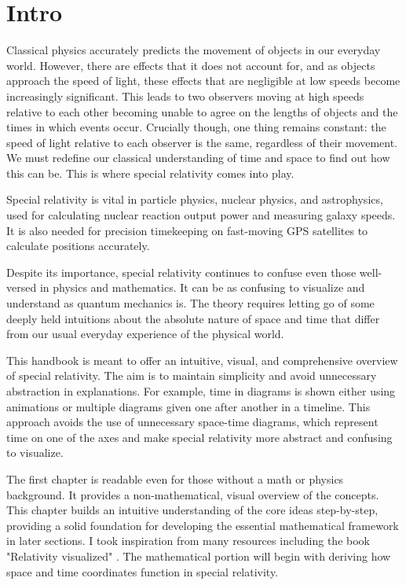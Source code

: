 \frontmatter
\chapter{Intro}

Classical physics accurately predicts the movement of objects in our everyday world.
However, there are effects that it does not account for, and as objects approach the speed of light, these effects that are negligible at low speeds become increasingly significant.
This leads to two observers moving at high speeds relative to each other becoming unable to agree on the lengths of objects and the times in which events occur.
Crucially though, one thing remains constant: the speed of light relative to each observer is the same, regardless of their movement.
We must redefine our classical understanding of time and space to find out how this can be.
This is where special relativity comes into play.

Special relativity is vital in particle physics, nuclear physics, and astrophysics, used for calculating nuclear reaction output power and measuring galaxy speeds.
It is also needed for precision timekeeping on fast-moving GPS satellites to calculate positions accurately.

Despite its importance, special relativity continues to confuse even those well-versed in physics and mathematics.
It can be as confusing to visualize and understand as quantum mechanics is.
The theory requires letting go of some deeply held intuitions about the absolute nature of space and time that differ from our usual everyday experience of the physical world.

This handbook is meant to offer an intuitive, visual, and comprehensive overview of special relativity.
The aim is to maintain simplicity and avoid unnecessary abstraction in explanations.
For example, time in diagrams is shown either using animations or multiple diagrams given one after another in a timeline.
This approach avoids the use of unnecessary space-time diagrams, which represent time on one of the axes and make special relativity more abstract and confusing to visualize.

The first chapter is readable even for those without a math or physics background.
It provides a non-mathematical, visual overview of the concepts.
This chapter builds an intuitive understanding of the core ideas step-by-step, providing a solid foundation for developing the essential mathematical framework in later sections. I took inspiration from many resources including the book "Relativity visualized" \cite{epstein1985relativity}.
The mathematical portion will begin with deriving how space and time coordinates function in special relativity.

